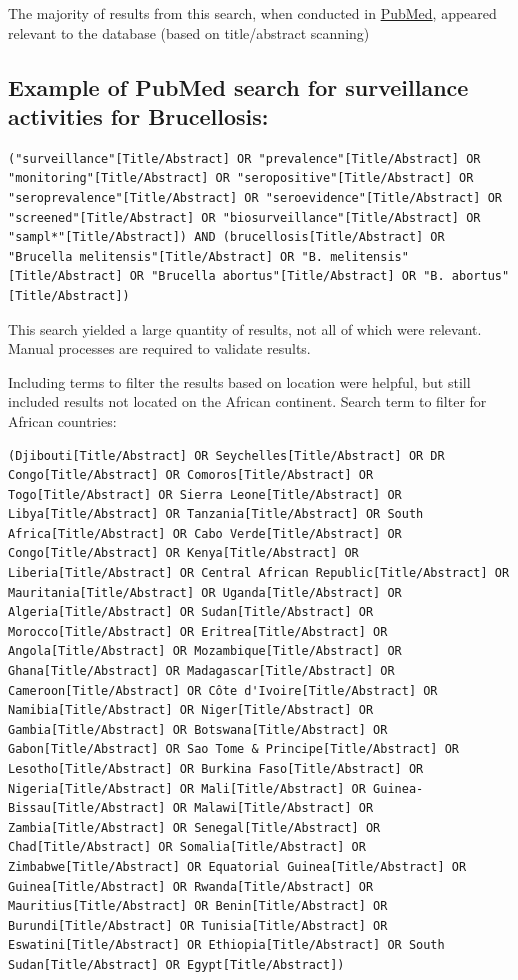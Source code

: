 \documentclass[
]{book}
\begin{document}
The majority of results from this search, when conducted in \href{https://pubmed.ncbi.nlm.nih.gov/}{PubMed}, appeared relevant to the database (based on title/abstract scanning)

\hypertarget{example-of-pubmed-search-for-surveillance-activities-for-brucellosis}{%
\subsection{Example of PubMed search for surveillance activities for Brucellosis:}\label{example-of-pubmed-search-for-surveillance-activities-for-brucellosis}}

\begin{verbatim}
("surveillance"[Title/Abstract] OR "prevalence"[Title/Abstract] OR "monitoring"[Title/Abstract] OR "seropositive"[Title/Abstract] OR "seroprevalence"[Title/Abstract] OR "seroevidence"[Title/Abstract] OR "screened"[Title/Abstract] OR "biosurveillance"[Title/Abstract] OR "sampl*"[Title/Abstract]) AND (brucellosis[Title/Abstract] OR "Brucella melitensis"[Title/Abstract] OR "B. melitensis"[Title/Abstract] OR "Brucella abortus"[Title/Abstract] OR "B. abortus"[Title/Abstract])  
\end{verbatim}

This search yielded a large quantity of results, not all of which were relevant. Manual processes are required to validate results.

Including terms to filter the results based on location were helpful, but still included results not located on the African continent. Search term to filter for African countries:

\begin{verbatim}
(Djibouti[Title/Abstract] OR Seychelles[Title/Abstract] OR DR Congo[Title/Abstract] OR Comoros[Title/Abstract] OR Togo[Title/Abstract] OR Sierra Leone[Title/Abstract] OR Libya[Title/Abstract] OR Tanzania[Title/Abstract] OR South Africa[Title/Abstract] OR Cabo Verde[Title/Abstract] OR Congo[Title/Abstract] OR Kenya[Title/Abstract] OR Liberia[Title/Abstract] OR Central African Republic[Title/Abstract] OR Mauritania[Title/Abstract] OR Uganda[Title/Abstract] OR Algeria[Title/Abstract] OR Sudan[Title/Abstract] OR Morocco[Title/Abstract] OR Eritrea[Title/Abstract] OR Angola[Title/Abstract] OR Mozambique[Title/Abstract] OR Ghana[Title/Abstract] OR Madagascar[Title/Abstract] OR Cameroon[Title/Abstract] OR Côte d'Ivoire[Title/Abstract] OR Namibia[Title/Abstract] OR Niger[Title/Abstract] OR Gambia[Title/Abstract] OR Botswana[Title/Abstract] OR Gabon[Title/Abstract] OR Sao Tome & Principe[Title/Abstract] OR Lesotho[Title/Abstract] OR Burkina Faso[Title/Abstract] OR Nigeria[Title/Abstract] OR Mali[Title/Abstract] OR Guinea-Bissau[Title/Abstract] OR Malawi[Title/Abstract] OR Zambia[Title/Abstract] OR Senegal[Title/Abstract] OR Chad[Title/Abstract] OR Somalia[Title/Abstract] OR Zimbabwe[Title/Abstract] OR Equatorial Guinea[Title/Abstract] OR Guinea[Title/Abstract] OR Rwanda[Title/Abstract] OR Mauritius[Title/Abstract] OR Benin[Title/Abstract] OR Burundi[Title/Abstract] OR Tunisia[Title/Abstract] OR Eswatini[Title/Abstract] OR Ethiopia[Title/Abstract] OR South Sudan[Title/Abstract] OR Egypt[Title/Abstract]) 
\end{verbatim}
\end{document}
